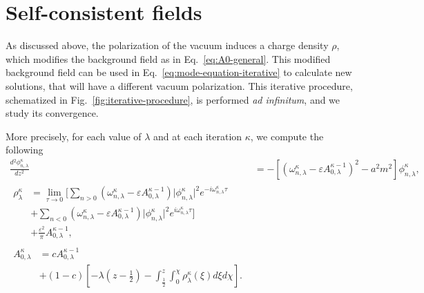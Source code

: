 \section{Self-consistent fields}
\label{sec:The-iterative-procedure}

As discussed above, the polarization of the vacuum induces a charge density $\rho$, which modifies the background field as in Eq.~\eqref{eq:A0-general}. This modified background field can be used in Eq.~\eqref{eq:mode-equation-iterative} to calculate new solutions, that will have a different vacuum polarization. This iterative procedure, schematized in Fig.~\ref{fig:iterative-procedure}, is performed \textit{ad infinitum}, and we study its convergence.



More precisely, for each value of $\lambda$ and at each iteration $\kappa$, we compute  the following
\begin{subequations}
\label{eq:iterative-procedure}
\begin{align}
    \frac{d {^2}\phi_{n, \lambda}^{\kappa}}{d {z^2}} {}  &= 
    -\left[ (\omega_{n, \lambda}^\kappa - \varepsilon A^{\kappa -1 }_{0, \lambda} )^2 
     - a^2 m^2\right] \phi_{n, \lambda}^{\kappa}, 
    \label{eq:mode-equation-iterative}
    \\
\begin{split}
        \rho_\lambda^{\kappa} &= \lim_{\tau \to 0} \Big[\sum_{n>0}^{} (\omega_{n,
        \lambda}^\kappa - \varepsilon A_{0, \lambda}^{\kappa-1} )\lvert \phi_{n,
        \lambda}^\kappa\rvert^2 e^{-i\omega^\kappa_{n, \lambda} \tau}\\
        &+\sum_{n<0}^{} (\omega^{\kappa}_{n, \lambda} - \varepsilon
        A_{0, \lambda}^{\kappa-1}) \lvert \phi^\kappa_{n, \lambda}\rvert^2
    e^{i\omega^{\kappa}_{n, \lambda} \tau}\Big] \\
    &+
    \frac{\varepsilon^2}{\pi}    A_{0, \lambda}^{\kappa-1} ,
\end{split}
\label{eq:vacuum-polarization-iterative}\\
\begin{split}
        A^{\kappa }_{0, \lambda} &= c A_{0, \lambda}^{\kappa-1} \\&+ \left(1-c
        \right)\left[ -\lambda\left(z - \frac{1}{2} \right) -
            \int_{\frac{1}{2}}^{z} \int_{0}^{\chi} \rho_\lambda^{\kappa}(\xi) d\xi d\chi
             \right] .
\end{split}
        \label{eq:A0-general-iterative}
\end{align}
\end{subequations}


